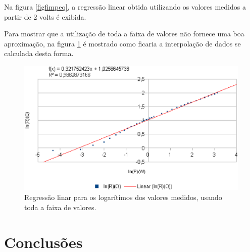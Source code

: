 \documentclass[brazilian,12pt,a4paper,twocolumn,final]{article}
\begin{document}
Na figura \ref{figfimpeq}, a regressão linear obtida utilizando 
os valores medidos a partir de 2 volts é exibida.


Para mostrar que a utilização de toda a faixa de valores não fornece uma boa aproximação,
na figura \ref{figfimgr} é mostrado como ficaria a interpolação de dados se calculada desta forma.

\begin{figure}[h]
  \caption{Regressão linar para os logarítimos dos valores medidos, usando toda a faixa de valores.}
  \label{figfimgr}
  \centering
    \includegraphics{fimgr.eps}
\end{figure}


\section{Conclusões}


\begin{thebibliography}{99}
\end{thebibliography}
\end{document}
